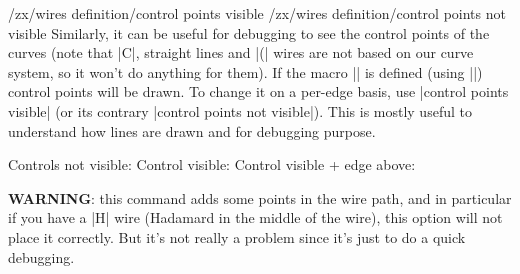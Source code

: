 \documentclass[a4paper,doc2]{ltxdoc} %
\begin{document}
\begin{pgfmanualentry}
  \def\extrakeytext{style, }
  \extractcommand\zxControlPointsVisible\@@
  \makeatletter%
  \extractkey/zx/wires definition/control points visible\@nil%
  \extractkey/zx/wires definition/control points not visible\@nil%
  \makeatother
  \pgfmanualbody
  Similarly, it can be useful for debugging to see the control points of the curves (note that |C|, straight lines and |(| wires are not based on our curve system, so it won't do anything for them). If the macro |\zxControlPointsVisible| is defined (using |\def\zxEdgesAbove{}|) control points will be drawn. To change it on a per-edge basis, use |control points visible| (or its contrary |control points not visible|). This is mostly useful to understand how lines are drawn and for debugging purpose.
\begin{codeexample}[]
  Controls not visible:
  \zx{\zxZ{\alpha+\beta} \ar[dr,s] \\
                         & \zxZ{\alpha+\beta}}
  Control visible:
  Control visible + edge above:
\end{codeexample}
\textbf{WARNING}: this command adds some points in the wire path, and in particular if you have a |H| wire (Hadamard in the middle of the wire), this option will not place it correctly. But it's not really a problem since it's just to do a quick debugging.
\end{pgfmanualentry}
\end{document}
